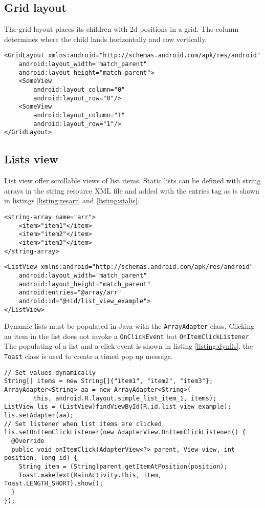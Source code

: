 \subsection{Grid layout}
The grid layout places its children with 2d positions in a grid. The column determines where the child lands horizontally and row vertically.
\begin{lstlisting}[style=A_XML, caption={Grid layout declaration}, label = {listing:gridlay}]
<GridLayout xmlns:android="http://schemas.android.com/apk/res/android"
    android:layout_width="match_parent"
    android:layout_height="match_parent">
    <SomeView
        android:layout_column="0"
        android:layout_row="0"/>
    <SomeView
        android:layout_column="1"
        android:layout_row="1"/>
</GridLayout>
\end{lstlisting}

\subsection{Lists view}
List view offer scrollable views of list items. Static lists can be defined with string arrays in the string resource XML file and added with the entries tag as is shown in listings \ref{listing:resarr} and \ref{listing:stalis}.
\begin{lstlisting}[style=A_XML, caption={Resource string array}, label = {listing:resarr}]
<string-array name="arr">
    <item>"item1"</item>
    <item>"item2"</item>
    <item>"item3"</item>
</string-array>
\end{lstlisting}
\begin{lstlisting}[style=A_XML, caption={Static list}, label = {listing:stalis}]
<ListView xmlns:android="http://schemas.android.com/apk/res/android"
    android:layout_width="match_parent"
    android:layout_height="match_parent"
    android:entries="@array/arr"
    android:id="@+id/list_view_example">
</ListView>
\end{lstlisting}

Dynamic lists must be populated in Java with the \texttt{ArrayAdapter} class. Clicking an item in the list does not invoke a \texttt{OnClickEvent} but \texttt{OnItemClickListener}. The populating of a list and a click event is shown in listing \ref{listing:dynlis}. the \texttt{Toast} class is used to create a timed pop up message.

\begin{lstlisting}[style=A_Java, caption={Dynamic list}, label = {listing:dynlis}]
// Set values dynamically
String[] items = new String[]{"item1", "item2", "item3"};
ArrayAdapter<String> aa = new ArrayAdapter<String>(
        this, android.R.layout.simple_list_item_1, items);
ListView lis = (ListView)findViewById(R.id.list_view_example);
lis.setAdapter(aa);
// Set listener when list items are clicked
lis.setOnItemClickListener(new AdapterView.OnItemClickListener() {
  @Override
  public void onItemClick(AdapterView<?> parent, View view, int position, long id) {
    String item = (String)parent.getItemAtPosition(position);
    Toast.makeText(MainActivity.this, item, Toast.LENGTH_SHORT).show();
  }
});
\end{lstlisting}

